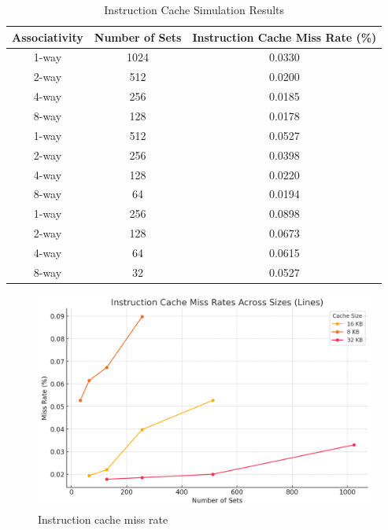 \documentclass{article}
\begin{document}
\begin{table}[h!]
	\centering
	\begin{tabular}{ccc}
		\toprule
		\textbf{Associativity} & \textbf{Number of Sets} & \textbf{Instruction Cache Miss Rate (\%)} \\
		\midrule
		1-way  & 1024 &   0.0330 \\
		2-way  & 512  &    0.0200\\
		4-way  & 256  &    0.0185\\
		8-way  & 128  &   0.0178 \\
		\midrule
		1-way  & 512  &    0.0527\\
		2-way  & 256  &    0.0398\\
		4-way  & 128  &   0.0220\\
		8-way  & 64   &   0.0194\\
		\midrule
		1-way  & 256  &    0.0898\\
		2-way  & 128  &    0.0673\\
		4-way  & 64   &    0.0615\\
		8-way  & 32   &    0.0527\\
		\bottomrule
	\end{tabular}
	\caption{Instruction Cache Simulation Results}
\end{table}
\begin{figure}[H]
	\centering
	\includegraphics[scale=0.5]{deliv1_instruction.png}
	\caption{Instruction cache miss rate}
	\label{fig:Instruction Cache Results}
\end{figure}
\end{document}
